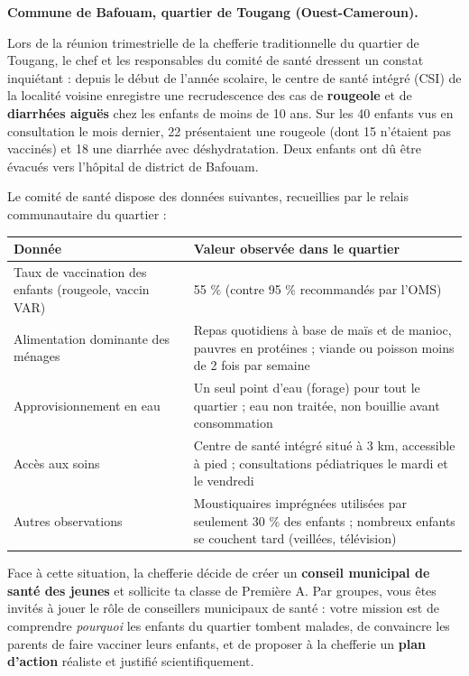 \documentclass[11pt]{article}
\newcommand{\cle}[1]{{\popxbold\color{popdark}#1}}
\newcounter{popsec}
\newcounter{popsub}
\newcommand{\courssub}[1]{%
  \stepcounter{popsub}%
  \par\vspace{9pt}\noindent{\popxbold\fontsize{11.5}{13}\selectfont\color{popink}{\color{poporange}\thepopsec.\thepopsub}\hspace{6pt}#1}\par\nopagebreak\vspace{4pt}
}
\begin{document}
\courssub{Situation}

\textbf{Commune de Bafouam, quartier de Tougang (Ouest-Cameroun).}

Lors de la réunion trimestrielle de la chefferie traditionnelle du quartier de Tougang, le chef et les responsables du comité de santé dressent un constat inquiétant : depuis le début de l'année scolaire, le centre de santé intégré (CSI) de la localité voisine enregistre une \cle{recrudescence} des cas de \textbf{rougeole} et de \textbf{diarrhées aiguës} chez les enfants de moins de 10 ans. Sur les 40 enfants vus en consultation le mois dernier, 22 présentaient une rougeole (dont 15 n'étaient pas vaccinés) et 18 une diarrhée avec déshydratation. Deux enfants ont dû être évacués vers l'hôpital de district de Bafouam.

Le comité de santé dispose des données suivantes, recueillies par le relais communautaire du quartier :

\begin{center}
\begin{tabularx}{\linewidth}{|l|X|}
\hline
\rowcolor{popblueL} \textbf{Donnée} & \textbf{Valeur observée dans le quartier} \\
\hline
Taux de vaccination des enfants (rougeole, vaccin VAR) & 55 \% (contre 95 \% recommandés par l'OMS) \\
\hline
Alimentation dominante des ménages & Repas quotidiens à base de maïs et de manioc, pauvres en protéines ; viande ou poisson moins de 2 fois par semaine \\
\hline
Approvisionnement en eau & Un seul point d'eau (forage) pour tout le quartier ; eau non traitée, non bouillie avant consommation \\
\hline
Accès aux soins & Centre de santé intégré situé à 3 km, accessible à pied ; consultations pédiatriques le mardi et le vendredi \\
\hline
Autres observations & Moustiquaires imprégnées utilisées par seulement 30 \% des enfants ; nombreux enfants se couchent tard (veillées, télévision) \\
\hline
\end{tabularx}
\end{center}

Face à cette situation, la chefferie décide de créer un \textbf{conseil municipal de santé des jeunes} et sollicite ta classe de Première A. Par groupes, vous êtes invités à jouer le rôle de conseillers municipaux de santé : votre mission est de comprendre \emph{pourquoi} les enfants du quartier tombent malades, de convaincre les parents de faire vacciner leurs enfants, et de proposer à la chefferie un \textbf{plan d'action} réaliste et justifié scientifiquement.
\end{document}
